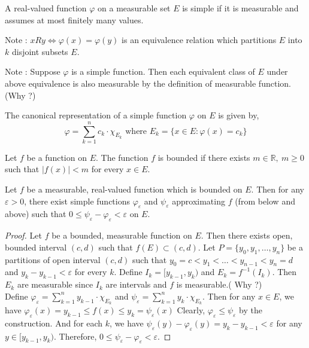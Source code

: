 \begin{definition}
	A real-valued function $\varphi$ on a measurable set $E$ is simple if it is measurable and assumes at most finitely many values.
\end{definition}

Note : $xRy \iff \varphi(x) = \varphi(y)$ is an equivalence relation which partitions $E$ into $k$ disjoint subsets $E$.

Note : Suppose $\varphi$ is a simple function.
Then each equivalent class of $E$ under above equivalence is also measurable by the definition of measurable function.(Why ?)

\begin{definition}
	The canonical representation of a simple function $\varphi$ on $E$ is given by,
	\begin{equation}
		\varphi = \sum_{k=1}^n c_k \cdot \chi_{E_k} \text{ where } E_k = \{ x \in E : \varphi(x) = c_k \} 
	\end{equation}
\end{definition}

\begin{definition}[bounded]
	Let $f$ be a function on $E$.
	The function $f$ is bounded if there exists $m \in \mathbb{R},\ m \ge 0$ such that $|f(x)| < m$ for every $x \in E$.
\end{definition}

\begin{lemma}
	Let $f$ be a measurable, real-valued function which is bounded on $E$.
	Then for any $\varepsilon > 0$, there exist simple functions $\varphi_\varepsilon$ and $\psi_\varepsilon$  approximating $f$ (from below and above) such that $0 \le \psi_\varepsilon - \varphi_\varepsilon < \varepsilon$ on $E$.
	\label{lem:simpleapproximation}
\end{lemma}
\begin{proof}
	Let $f$ be a bounded, measurable function on $E$.
	Then there exists open, bounded interval $(c,d)$ such that $f(E) \subset (c,d)$.
	Let $P = \{y_0,y_1,\dots,y_n\}$ be a partitions of open interval $(c,d)$ such that $y_0 =c < y_1 < \dots < y_{n-1} < y_n = d$ and $y_k - y_{k-1} < \varepsilon$ for every $k$.
	Define $I_k = [y_{k-1},y_k)$ and $E_k = f^{-1}(I_k)$.
	Then $E_k$ are measurable since $I_k$ are intervals and $f$ is measurable.({ \color{blue}Why ?})\\

	Define $\displaystyle \varphi_\varepsilon = \sum_{k=1}^n y_{k-1} \cdot \chi_{E_k}$ and $\displaystyle \psi_\varepsilon = \sum_{k=1}^n y_k \cdot \chi_{E_k}$.
	Then for any $x \in E$, we have $\varphi_\varepsilon(x) = y_{k-1} \le f(x) \le y_k = \psi_\varepsilon(x)$
	Clearly, $\varphi_\varepsilon \le \psi_\varepsilon$ by the construction.
	And for each $k$, we have $\psi_\varepsilon(y) - \varphi_\varepsilon(y) = y_k - y_{k-1} < \varepsilon$ for any $y \in [y_{k-1},y_k)$.
	Therefore, $0 \le \psi_\varepsilon - \varphi_\varepsilon < \varepsilon$.
\end{proof}

